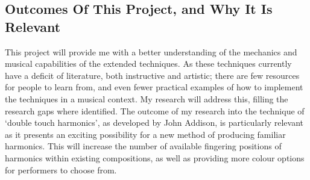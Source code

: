 \subsection{Outcomes Of This Project, and Why It Is Relevant}
This project will provide me with a better understanding of the mechanics and musical capabilities of the extended techniques. As these techniques currently have a deficit of literature, both instructive and artistic; there are few resources for people to learn from, and even fewer practical examples of how to implement the techniques in a musical context.
My research will address this, filling the research gaps where identified.
The outcome of my research into the technique of `double touch harmonics', as developed by John Addison, is particularly relevant as it presents an exciting possibility for a new method of producing familiar harmonics.
This will increase the number of available fingering positions of harmonics within existing compositions, as well as providing more colour options for performers to choose from.
